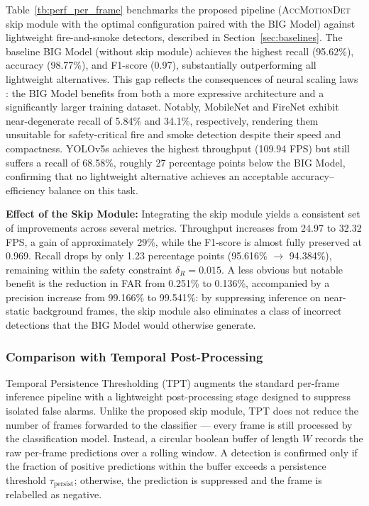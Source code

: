 \documentclass[final,3p,times,twocolumn]{elsarticle}
\begin{document}
Table~\ref{tb:perf_per_frame} benchmarks the proposed pipeline
(\textsc{AccMotionDet} skip module with the optimal configuration
paired with the BIG Model) against lightweight fire-and-smoke
detectors, described in Section~\ref{sec:baselines}. The baseline BIG
Model (without skip module) achieves the highest recall (95.62\%),
accuracy (98.77\%), and F1-score (0.97), substantially outperforming
all lightweight alternatives. This gap reflects the consequences of
neural scaling laws \cite{hestness2017deep,alabdulmohsin2022revisiting,bahri2024explaining}:
the BIG Model benefits from both a more expressive architecture and a
significantly larger training dataset. Notably, MobileNet and FireNet
exhibit near-degenerate recall of 5.84\% and 34.1\%, respectively,
rendering them unsuitable for safety-critical fire and smoke detection
despite their speed and compactness. YOLOv5s achieves the highest
throughput (109.94 FPS) but still suffers a recall of 68.58\%, roughly
27 percentage points below the BIG Model, confirming that no
lightweight alternative achieves an acceptable accuracy--efficiency
balance on this task.

\textbf{Effect of the Skip Module:} Integrating the skip module yields
a consistent set of improvements across several metrics. Throughput
increases from 24.97 to 32.32 FPS, a gain of approximately 29\%, while
the F1-score is almost fully preserved at 0.969. Recall drops by only
1.23 percentage points (95.616\% $\to$ 94.384\%), remaining within the
safety constraint $\delta_R = 0.015$. A less obvious but notable
benefit is the reduction in FAR from 0.251\% to 0.136\%, accompanied by
a precision increase from 99.166\% to 99.541\%: by suppressing
inference on near-static background frames, the skip module also
eliminates a class of incorrect detections that the BIG Model would
otherwise generate.

\subsubsection{Comparison with Temporal Post-Processing}\label{sec:cmp-temporal}

Temporal Persistence Thresholding (TPT) \cite{de2023hybrid} augments
the standard per-frame inference pipeline with a lightweight
post-processing stage designed to suppress isolated false alarms.
Unlike the proposed skip module, TPT does not reduce the number of
frames forwarded to the classifier --- every frame is still processed
by the classification model. Instead, a circular boolean buffer of
length $W$ records the raw per-frame predictions over a rolling window.
A detection is confirmed only if the fraction of positive predictions
within the buffer exceeds a persistence threshold
$\tau_\text{persist}$; otherwise, the prediction is suppressed and the
frame is relabelled as negative.
\end{document}
